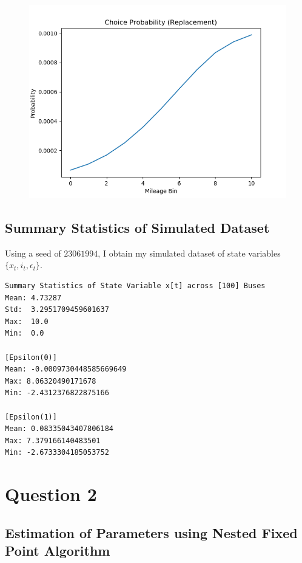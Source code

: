 \documentclass{article}
\begin{document}
\begin{figure}[h]
  \centering
    \includegraphics[width=1.0\textwidth]{Figure_3}
\end{figure}
\FloatBarrier

\subsection{Summary Statistics of Simulated Dataset}

Using a seed of $23061994$, I obtain my simulated dataset of state variables $\{ x_t, i_t, \epsilon_t \}$.

\begin{lstlisting}
Summary Statistics of State Variable x[t] across [100] Buses
Mean: 4.73287
Std:  3.2951709459601637
Max:  10.0
Min:  0.0

[Epsilon(0)]
Mean: -0.0009730448585669649
Max: 8.06320490171678
Min: -2.4312376822875166

[Epsilon(1)]
Mean: 0.08335043407806184
Max: 7.379166140483501
Min: -2.6733304185053752
\end{lstlisting}

\newpage

\section{Question 2}

\subsection{Estimation of Parameters using Nested Fixed Point Algorithm}
\end{document}

